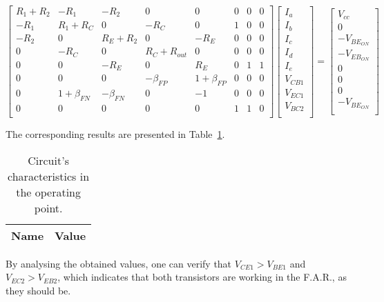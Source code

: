 \[
{\begin{bmatrix}
R_1+R_2 & -R_1 & -R_2 & 0 & 0 & 0 & 0 & 0\\
-R_1 & R_1+R_C & 0 & -R_C & 0 & 1 & 0 & 0\\
-R_2 & 0 & R_E+R_2 & 0 & -R_E & 0 & 0 & 0\\
0 & -R_C & 0 & R_C+R_{out} & 0 & 0 & 0 & 0\\
0 & 0 & -R_E & 0 & R_E & 0 & 1 & 1\\
0 & 0 & 0 & -\beta_{FP} & 1+\beta_{FP} & 0 & 0 & 0\\
0 & 1+\beta_{FN} & -\beta_{FN} & 0 & -1 & 0 & 0 & 0\\
0 & 0 & 0 & 0 & 0 & 1 & 1 & 0\\
            \end{bmatrix}
            }
{\begin{bmatrix}
I_a\\
I_b\\
I_c\\
I_d\\
I_e\\
V_{CB1}\\
V_{EC1}\\
V_{BC2}\\
            \end{bmatrix}
            }
    =
{\begin{bmatrix}
V_{cc}\\
0\\
-V_{{BE}_{ON}}\\
-V_{{EB}_{ON}}\\
0\\
0\\
0\\
-V_{{BE}_{ON}}\\
            \end{bmatrix}
            }
\]

The corresponding results are presented in Table~\ref{tab:op}. \\

\begin{table}[H]
  \centering
  \begin{tabular}{|l|r|}
    \hline    
    {\bf Name} & {\bf Value} \\ \hline
    
  \end{tabular}
  \caption{Circuit's characteristics in the operating point.}
  \label{tab:op}
\end{table}

By analysing the obtained values, one can verify that $V_{CE1}>V_{BE1}$ and $V_{EC2}>V_{EB2}$, which indicates that both transistors are working in the F.A.R., as they should be. \\

